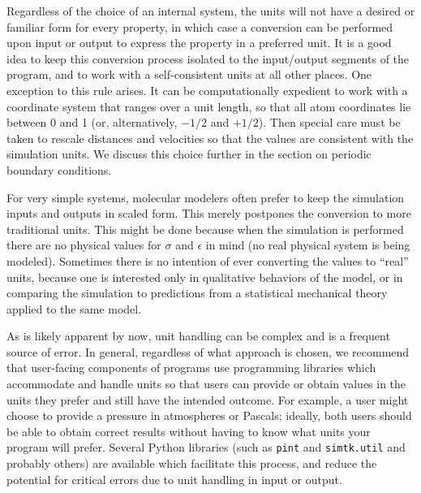 \documentclass[9pt,bestpractices]{molsim}
\begin{document}
Regardless of the choice of an internal system, the units will not have
a desired or familiar form for every property, in which case a
conversion can be performed upon input or output to express the property
in a preferred unit. It is a good idea to keep this conversion process
isolated to the input/output segments of the program, and to work with a
self-consistent units at all other places. One exception to this rule
arises. It can be computationally expedient to work with a coordinate
system that ranges over a unit length, so that all atom coordinates lie
between 0 and 1 (or, alternatively, $-1/2$ and $+1/2$). Then special care
must be taken to rescale distances and velocities so that the values are
consistent with the simulation units. We discuss this choice further in
the section on periodic boundary conditions.

For very simple systems, molecular modelers often prefer to keep the
simulation inputs and outputs in scaled form. This merely postpones the
conversion to more traditional units. This might be done because when
the simulation is performed there are no physical values for $\sigma$ and $\epsilon$ in
mind (no real physical system is being modeled). Sometimes there is no
intention of ever converting the values to ``real'' units, because one
is interested only in qualitative behaviors of the model, or in
comparing the simulation to predictions from a statistical mechanical
theory applied to the same model.

As is likely apparent by now, unit handling can be complex and is a frequent source of error.
In general, regardless of what approach is chosen, we recommend that user-facing components of programs use programming libraries which accommodate and handle units so that users can provide or obtain values in the units they prefer and still have the intended outcome.
For example, a user might choose to provide a pressure in atmospheres or Pascals; ideally, both users should be able to obtain correct results without having to know what units your program will prefer.
Several Python libraries (such as \texttt{pint} and \texttt{simtk.util} and probably others) are available which facilitate this process, and reduce the potential for critical errors due to unit handling in input or output.
\end{document}
